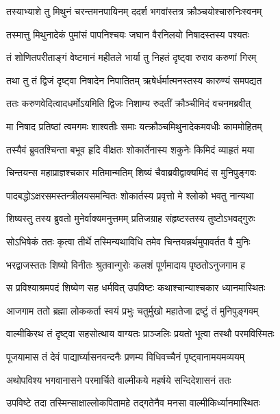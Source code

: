 \twolineshloka
{तस्याभ्याशे तु मिथुनं चरन्तमनपायिनम्}
{ददर्श भगवांस्तत्र क्रौञ्चयोश्चारुनिःस्वनम्} %

\twolineshloka
{तस्मात्तु मिथुनादेकं पुमांसं पापनिश्चयः}
{जघान वैरनिलयो निषादस्तस्य पश्यतः} %

\twolineshloka
{तं शोणितपरीताङ्गं वेष्टमानं महीतले}
{भार्या तु निहतं दृष्ट्वा रुराव करुणां गिरम्} %

\twolineshloka
{तथा तु तं द्विजं दृष्ट्वा निषादेन निपातितम्}
{ऋषेर्धर्मात्मनस्तस्य कारुण्यं समपद्यत} %

\twolineshloka
{ततः करुणवेदित्वादधर्मोऽयमिति द्विजः}
{निशाम्य रुदतीं क्रौञ्चीमिदं वचनमब्रवीत्} %

\twolineshloka
{मा निषाद प्रतिष्ठां त्वमगमः शाश्वतीः समाः}
{यत्क्रौञ्चमिथुनादेकमवधीः काममोहितम्} %

\twolineshloka
{तस्यैवं ब्रुवतश्चिन्ता बभूव हृदि वीक्षतः}
{शोकार्तेनास्य शकुनेः किमिदं व्याहृतं मया} %

\twolineshloka
{चिन्तयन्स महाप्राज्ञश्चकार मतिमान्मतिम्}
{शिष्यं चैवाब्रवीद्वाक्यमिदं स मुनिपुङ्गवः} %

\twolineshloka
{पादबद्धोऽक्षरसमस्तन्त्रीलयसमन्वितः}
{शोकार्तस्य प्रवृत्तो मे श्लोको भवतु नान्यथा} %

\twolineshloka
{शिष्यस्तु तस्य ब्रुवतो मुनेर्वाक्यमनुत्तमम्}
{प्रतिजग्राह संहृष्टस्तस्य तुष्टोऽभवद्गुरुः} %

\twolineshloka
{सोऽभिषेकं ततः कृत्वा तीर्थे तस्मिन्यथाविधि}
{तमेव चिन्तयन्नर्थमुपावर्तत वै मुनिः} %

\twolineshloka
{भरद्वाजस्ततः शिष्यो विनीतः श्रुतवान्गुरोः}
{कलशं पूर्णमादाय पृष्ठतोऽनुजगाम ह} %

\twolineshloka
{स प्रविश्याश्रमपदं शिष्येण सह धर्मवित्}
{उपविष्टः कथाश्चान्याश्चकार ध्यानमास्थितः} %

\twolineshloka
{आजगाम ततो ब्रह्मा लोककर्ता स्वयं प्रभुः}
{चतुर्मुखो महातेजा द्रष्टुं तं मुनिपुङ्गवम्} %

\twolineshloka
{वाल्मीकिरथ तं दृष्ट्वा सहसोत्थाय वाग्यतः}
{प्राञ्जलिः प्रयतो भूत्वा तस्थौ परमविस्मितः} %

\twolineshloka
{पूजयामास तं देवं पाद्यार्घ्यासनवन्दनैः}
{प्रणम्य विधिवच्चैनं पृष्ट्वानामयमव्ययम्} %

\twolineshloka
{अथोपविश्य भगवानासने परमार्चिते}
{वाल्मीकये महर्षये सन्दिदेशासनं ततः} %

\twolineshloka
{उपविष्टे तदा तस्मिन्साक्षाल्लोकपितामहे}
{तद्गतेनैव मनसा वाल्मीकिर्ध्यानमास्थितः} %

